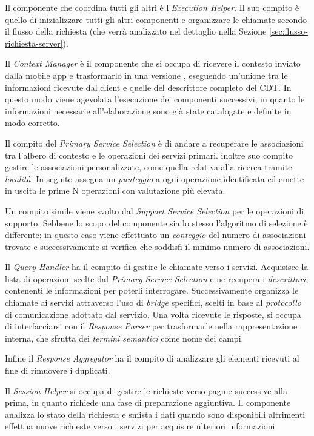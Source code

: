 Il componente che coordina tutti gli altri è l'\emph{Execution Helper}. Il suo compito è quello di inizializzare tutti gli altri componenti e organizzare le chiamate secondo il flusso della richiesta (che verrà analizzato nel dettaglio nella Sezione \ref{sec:flusso-richiesta-server}).

Il \emph{Context Manager} è il componente che si occupa di ricevere il contesto inviato dalla mobile app e trasformarlo in una versione , eseguendo un'unione tra le informazioni ricevute dal client e quelle del descrittore completo del CDT. In questo modo viene agevolata l'esecuzione dei componenti successivi, in quanto le informazioni necessarie all'elaborazione sono già state catalogate e definite in modo corretto.

Il compito del \emph{Primary Service Selection} è di andare a recuperare le associazioni tra l'albero di contesto e le operazioni dei servizi primari. \upe inoltre suo compito gestire le associazioni personalizzate, come quella relativa alla ricerca tramite \emph{località}. In seguito assegna un \emph{punteggio} a ogni operazione identificata ed emette in uscita le prime N operazioni con valutazione più elevata.

Un compito simile viene svolto dal \emph{Support Service Selection} per le operazioni di supporto. Sebbene lo scopo del componente sia lo stesso l'algoritmo di selezione è differente: in questo caso viene effettuato un \emph{conteggio} del numero di associazioni trovate e successivamente si verifica che soddisfi il minimo numero di associazioni.

Il \emph{Query Handler} ha il compito di gestire le chiamate verso i servizi. Acquisisce la lista di operazioni scelte dal \emph{Primary Service Selection} e ne recupera i \emph{descrittori}, contenenti le informazioni per poterli interrogare. Successivamente organizza le chiamate ai servizi attraverso l'uso di \emph{bridge} specifici, scelti in base al \emph{protocollo} di comunicazione adottato dal servizio. Una volta ricevute le risposte, si occupa di interfacciarsi con il \emph{Response Parser} per trasformarle nella rappresentazione interna, che sfrutta dei \emph{termini semantici} come nome dei campi.

Infine il \emph{Response Aggregator} ha il compito di analizzare gli elementi ricevuti al fine di rimuovere i duplicati.

Il \emph{Session Helper} si occupa di gestire le richieste verso pagine successive alla prima, in quanto richiede una fase di preparazione aggiuntiva. Il componente analizza lo stato della richiesta e smista i dati quando sono disponibili altrimenti effettua nuove richieste verso i servizi per acquisire ulteriori informazioni.

